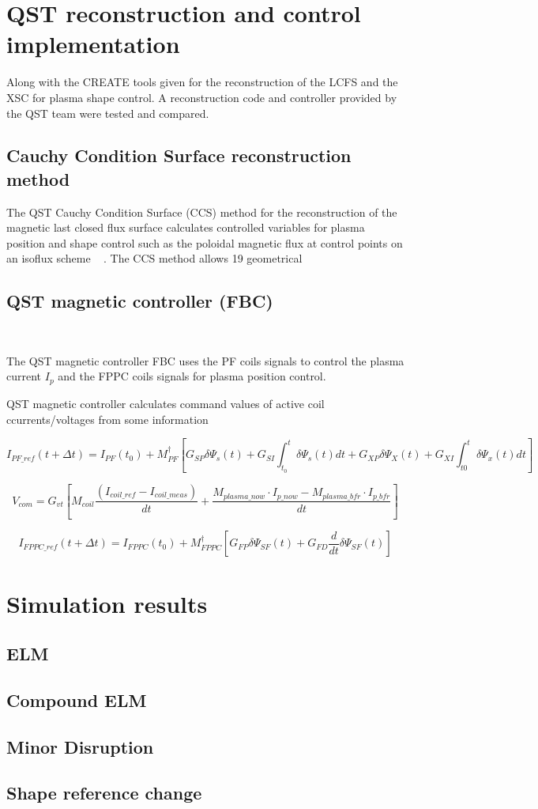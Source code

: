 \section{QST reconstruction and control implementation}

Along with the CREATE tools given for the reconstruction of the LCFS and the XSC for  plasma shape control. A reconstruction code and controller provided by the QST team were tested and compared.

\subsection{Cauchy Condition Surface reconstruction  method }
The QST Cauchy Condition Surface (CCS) method for the reconstruction of the magnetic last closed flux surface calculates controlled variables for plasma position and shape control such as the poloidal magnetic flux at control points on an isoflux scheme  ~\cite{CCS} . The CCS method allows 19 geometrical 

\subsection{QST magnetic controller (FBC)}

~\cite{FBC}

The QST magnetic controller FBC uses the PF coils signals to control the plasma current $I_p$ and the FPPC coils signals for plasma position control.

QST magnetic controller calculates command values of active coil ccurrents/voltages from some information

\begin{equation}
I_{PF\_ref}(t+\Delta t) = I_{PF}(t_0)+M^\dagger_{PF}\left[G_{SP}\delta\Psi_s(t)+G_{SI}\int_{t_0}^{t}\delta\Psi_s(t)dt+G_{XP}\delta\Psi_X(t)+G_{XI}\int_{t0}^{t}\delta\Psi_x(t)dt\right]
\end{equation}

\begin{equation}
V_{com}=G_{vt}\left[M_{coil}\frac{(I_{coil\_ref}-I_{coil\_meas})}{dt}+ \frac{M_{plasma\_now} \cdot I_{p\_now} - M_{plasma\_ bfr} \cdot I_{p\_bfr}}{dt}\right]
\end{equation}

\begin{equation}
I_{FPPC\_ref}(t+\Delta t)=I_{FPPC}(t_0)+ M^\dagger_{FPPC}\left[G_{FP}\delta \Psi_{SF}(t) + G_{FD}\frac{d}{dt}\delta\Psi_{SF}(t) \right]
\end{equation}
\section{Simulation results}	

\subsection{ELM}
\subsection{Compound ELM}
\subsection{Minor Disruption}
\subsection{Shape reference change}